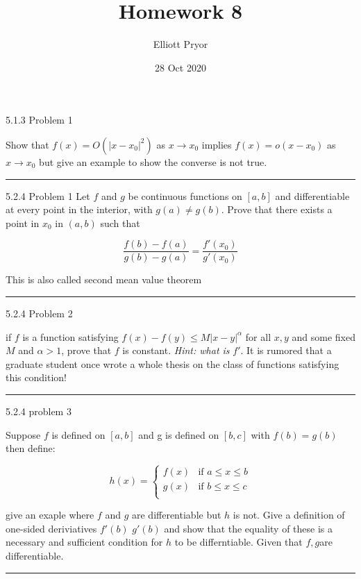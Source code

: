 \documentclass[11pt]{article}
\title{Homework 8}
\author{Elliott Pryor}
\date{28 Oct 2020}
\begin{document}
\maketitle

 5.1.3 Problem 1

Show that $f(x) = O(|x - x_0|^2)$ as $x \to x_0$ implies $f(x) = o(x - x_0)$ as $x\to x_0$ but give an example to show the converse is not true.

\hrule






 5.2.4 Problem 1
Let $f$ and $g$ be continuous functions on $[a,b]$ and differentiable at every point in the interior, with $g(a) \neq g(b)$. Prove that there exists a point in $x_0$ in $(a,b)$ such that

$$\frac{f(b) - f(a)}{g(b)-g(a)} = \frac{f'(x_0)}{g'(x_0)}$$

This is also called second mean value theorem

\hrule





 5.2.4 Problem 2

if $f$ is a function satisfying $f(x) - f(y) \leq M|x - y|^\alpha$
for all $x,y$ and some fixed $M$ and $\alpha > 1$, prove that $f$ is constant.
\textit{Hint: what is }$f'$. It is rumored that a graduate student once wrote a whole
thesis on the class of functions satisfying this condition!

\hrule







 5.2.4 problem 3

Suppose $f$ is defined on $[a,b]$ and g is defined on $[b,c]$ with $f(b) = g(b)$ then define:

$$h(x) = \begin{cases}
f(x) & \text{if } a \leq x \leq b\\
g(x) & \text{if } b \leq x \leq c\\
\end{cases}$$

give an exaple where $f$ and $g$ are differentiable but $h$ is not.
Give a definition of one-sided deriviatives $f'(b)$ $g'(b)$ and show that the equality of these is a necessary and sufficient condition for $h$ to be differntiable. Given that $f,g$are differentiable.


\hrule
\end{document}
